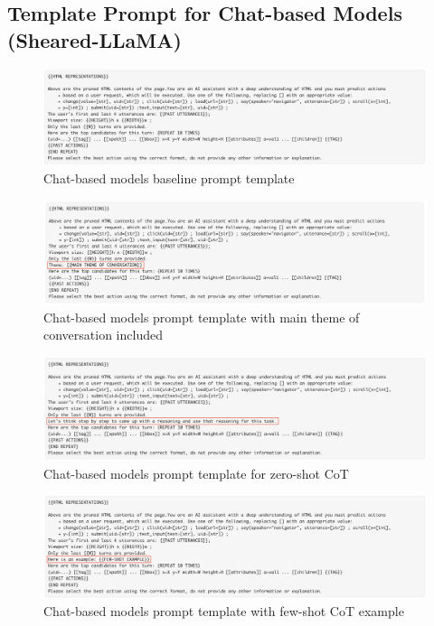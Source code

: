 \documentclass[11pt]{article}
\begin{document}
\subsection{Template Prompt for Chat-based Models (Sheared-LLaMA)}

\begin{figure}[ht]
\includegraphics[width=\textwidth]{prompts/Chat-base-template.png}
\caption{Chat-based models baseline prompt template}\label{fig:fig1}
\centering
\end{figure}

\begin{figure}[ht]
\includegraphics[width=\textwidth]{prompts/Chat-History-template.png}
\caption{Chat-based models prompt template with main theme of conversation included}\label{fig:fig2}
\centering
\end{figure}

\begin{figure}[ht]
\includegraphics[width=\textwidth]{prompts/Chat-Zero-shot-template.png}
\caption{Chat-based models prompt template for zero-shot CoT}\label{fig:fig3}
\centering
\end{figure}

\begin{figure}[ht]
\includegraphics[width=\textwidth]{prompts/Chat-few-shot-template.png}
\caption{Chat-based models prompt template with few-shot CoT example}\label{fig:fig4}
\centering
\end{figure}
\end{document}
